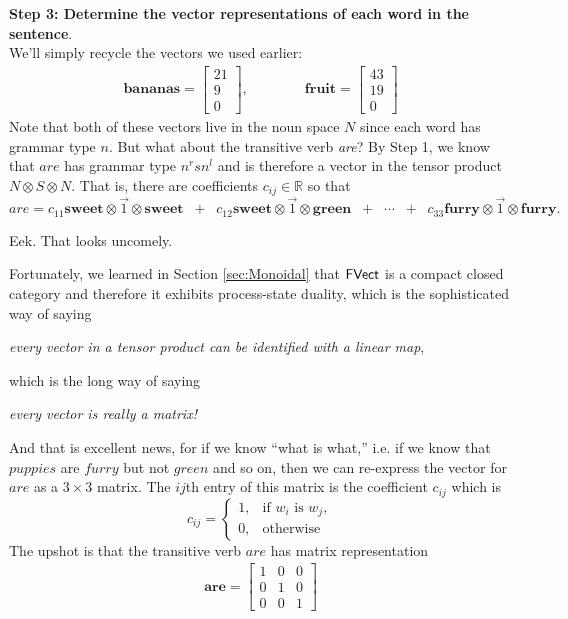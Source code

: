 \documentclass{tufte-handout-tai}
\newcommand{\cat}[1]{{\normalfont\textsf{#1}}}
\theoremstyle{plain}
\theoremstyle{definition}
\theoremstyle{remark}
\begin{document}
\vspace{0.4cm}
\noindent\textbf{\large Step 3: Determine the vector representations of each word in the sentence}.\\[10pt]

\noindent We'll simply recycle the vectors we used earlier:
\begin{align*}
\mathbf{bananas} = \begin{bmatrix}21\\9\\0\end{bmatrix},\qquad\qquad
\mathbf{fruit} = \begin{bmatrix}43\\19\\0\end{bmatrix}
\end{align*}
Note that both of these vectors live in the noun space $N$ since each word has grammar type $n$. But what about the transitive verb \textit{are}? By Step 1, we know that $are$ has grammar type $n^rsn^l$ and is therefore a vector in the tensor product $N\otimes S\otimes N$. That is, there are coefficients $c_{ij}\in\mathbb{R}$ so that
\[are = c_{11}\mathbf{sweet}\otimes \vec{1}\otimes \mathbf{sweet} \;\;+\;\; 
c_{12}\mathbf{sweet}\otimes \vec{1}\otimes \mathbf{green} 
\;\;+\;\; \cdots \;\;+\;\; c_{33}\mathbf{furry}\otimes \vec{1}\otimes \mathbf{furry}.\]

\vspace{0.4cm}
\noindent Eek. That looks uncomely. 
\vspace{0.4cm}

\noindent Fortunately, we learned in Section \ref{sec:Monoidal} that $\cat{FVect}$ is a compact closed category and therefore it exhibits process-state duality, which is the sophisticated way of saying 
\begin{center}\textit{every vector in a tensor product can be identified with a linear map},
\end{center} 
which is the long way of saying 
\begin{center}\textit{every vector is really a matrix!}
\end{center} 
\noindent And that is excellent news, for if we know ``what is what,'' i.e. if we know that $puppies$ are $furry$ but not $green$ and so on, then we can re-express the vector for $are$ as a $3\times 3$ matrix. The $ij$th entry of this matrix is the coefficient $c_{ij}$ which is
\[
c_{ij}=
\begin{cases} 1, &\text{if $w_i$ is $w_j$},\\
0, &\text{otherwise}
\end{cases}
\]
The upshot is that the transitive verb $are$ has matrix representation
\begin{align*}\label{eq:are}
\mathbf{are} = 
\begin{bmatrix}
1 & 0 & 0\\
0 & 1 & 0\\
0 & 0 & 1
\end{bmatrix}
\end{align*}
\end{document}
